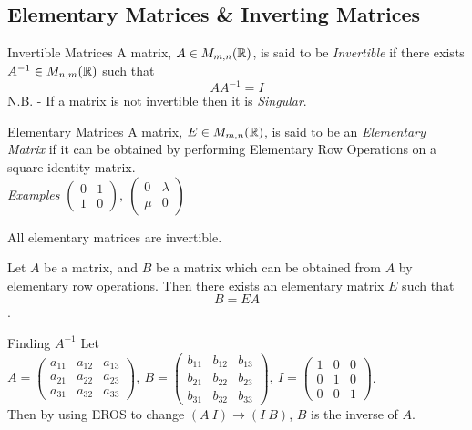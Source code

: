 \documentclass[11pt,a4paper]{article}
\begin{document}
\subsection{Elementary Matrices \& Inverting Matrices}
%
\subtitle{Definition 3.22 - }{Invertible Matrices}
A matrix, $A \in M_{m,n}(\mathbb{R})$, is said to be \textit{Invertible} if there exists $A^{-1} \in M_{n,m}(\mathbb{R})$ such that
$$AA^{-1} = I$$
\underline{N.B.} - If a matrix is not invertible then it is \textit{Singular}.\\

\subtitle{Definition 3.23 - }{Elementary Matrices}
A matrix, $E \in M_{m,n}(\mathbb{R})$, is said to be an \textit{Elementary Matrix} if it can be obtained by performing Elementary Row Operations on a square identity matrix.\\
\textit{Examples}
$\begin{pmatrix}
  0 & 1 \\
  1 & 0
\end{pmatrix},\ \begin{pmatrix}
  0 & \lambda \\
  \mu & 0
\end{pmatrix}$ \\

\subtitle{Remark 3.24}{}
All elementary matrices are invertible.

\subtitle{Remark 3.25}{}
Let $A$ be a matrix, and $B$ be a matrix which can be obtained from $A$ by elementary row operations. Then there exists an elementary matrix $E$ such that $$B = EA$$.

\subtitle{Theorem 3.26 - }{Finding $A^{-1}$}
Let $A = \begin{pmatrix}
  a_{11} & a_{12} & a_{13} \\
  a_{21} & a_{22} & a_{23} \\
  a_{31} & a_{32} & a_{33}
\end{pmatrix},\ B = \begin{pmatrix}
  b_{11} & b_{12} & b_{13} \\
  b_{21} & b_{22} & b_{23} \\
  b_{31} & b_{32} & b_{33}
\end{pmatrix},\ I = \begin{pmatrix}
  1 & 0 & 0 \\
  0 & 1 & 0 \\
  0 & 0 & 1
\end{pmatrix}$. \\
Then by using EROS to change $(A\ I) \to (I\ B)$, $B$ is the inverse of $A$. \\
\end{document}
